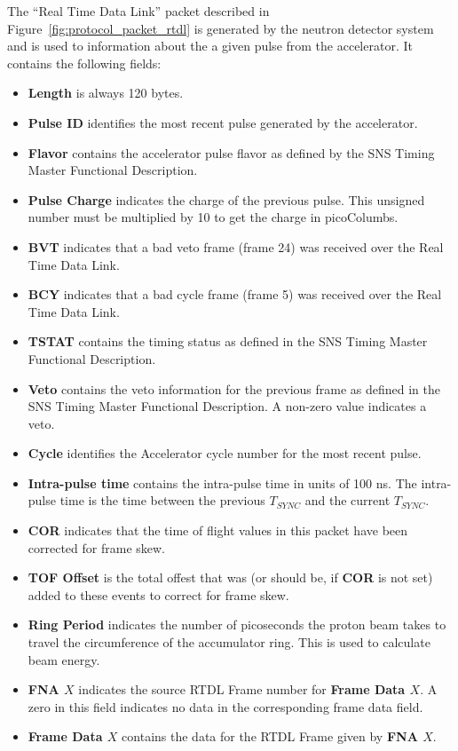 The ``Real Time Data Link'' packet described in
Figure~\ref{fig:protocol_packet_rtdl} is generated by the neutron
detector system and is used to information about the a given pulse
from the accelerator.  It contains the following fields:
\begin{itemize}
\item{\bf Length} is always 120 bytes.
\item{\bf Pulse ID} identifies the most recent pulse generated by the
accelerator.
\item{\bf Flavor} contains the accelerator pulse flavor as defined by
the SNS Timing Master Functional Description.
\item{\bf Pulse Charge} indicates the charge of the previous pulse. This
unsigned number must be multiplied by 10 to get the charge in picoColumbs.
\item{\bf BVT} indicates that a bad veto frame (frame 24) was received over the
Real Time Data Link.
\item{\bf BCY} indicates that a bad cycle frame (frame 5) was received over the Real Time Data Link.
\item{\bf TSTAT} contains the timing status as defined in the SNS Timing Master
Functional Description.
\item{\bf Veto} contains the veto information for the previous frame as defined
in the SNS Timing Master Functional Description. A non-zero value indicates
a veto.
\item{\bf Cycle} identifies the Accelerator cycle number for the most
recent pulse.
\item{\bf Intra-pulse time} contains the intra-pulse time in units of 100 ns.
The intra-pulse time is the time between the previous $T_{SYNC}$ and the
current $T_{SYNC}$.
\item{\bf COR} indicates that the time of flight values in this packet have
been corrected for frame skew.
\item{\bf TOF Offset} is the total offest that was (or should be, if {\bf COR}
is not set) added to these events to correct for frame skew.
\item{\bf Ring Period} indicates the number of picoseconds the proton beam
takes to travel the circumference of the accumulator ring. This is used
to calculate beam energy.
\item{\bf FNA $X$} indicates the source RTDL Frame number for
{\bf Frame Data $X$}. A zero in this field indicates no data in
the corresponding frame data field.
\item{\bf Frame Data $X$} contains the data for the RTDL Frame given by
{\bf FNA $X$}.
\end{itemize}



